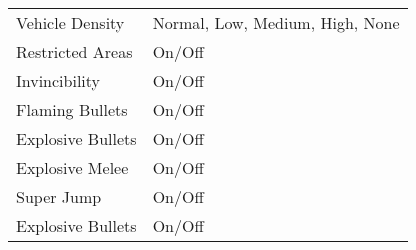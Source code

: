 \documentclass[
  openany]{book}
\begin{document}
\begin{longtable}[]{@{}ll@{}}
\begin{minipage}[t]{0.47\columnwidth}
Vehicle Density\strut
\end{minipage} & \begin{minipage}[t]{0.47\columnwidth}\raggedright
Normal, Low, Medium, High, None\strut
\end{minipage}\tabularnewline
\begin{minipage}[t]{0.47\columnwidth}\raggedright
Restricted Areas\strut
\end{minipage} & \begin{minipage}[t]{0.47\columnwidth}\raggedright
On/Off\strut
\end{minipage}\tabularnewline
\begin{minipage}[t]{0.47\columnwidth}\raggedright
Invincibility\strut
\end{minipage} & \begin{minipage}[t]{0.47\columnwidth}\raggedright
On/Off\strut
\end{minipage}\tabularnewline
\begin{minipage}[t]{0.47\columnwidth}\raggedright
Flaming Bullets\strut
\end{minipage} & \begin{minipage}[t]{0.47\columnwidth}\raggedright
On/Off\strut
\end{minipage}\tabularnewline
\begin{minipage}[t]{0.47\columnwidth}\raggedright
Explosive Bullets\strut
\end{minipage} & \begin{minipage}[t]{0.47\columnwidth}\raggedright
On/Off\strut
\end{minipage}\tabularnewline
\begin{minipage}[t]{0.47\columnwidth}\raggedright
Explosive Melee\strut
\end{minipage} & \begin{minipage}[t]{0.47\columnwidth}\raggedright
On/Off\strut
\end{minipage}\tabularnewline
\begin{minipage}[t]{0.47\columnwidth}\raggedright
Super Jump\strut
\end{minipage} & \begin{minipage}[t]{0.47\columnwidth}\raggedright
On/Off\strut
\end{minipage}\tabularnewline
\begin{minipage}[t]{0.47\columnwidth}\raggedright
Explosive Bullets\strut
\end{minipage} & \begin{minipage}[t]{0.47\columnwidth}\raggedright
On/Off\strut
\end{minipage}\tabularnewline

\end{longtable}
\end{document}
